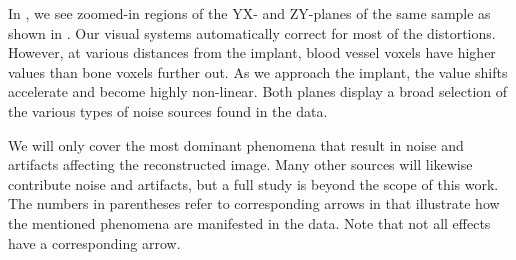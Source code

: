 In , we see zoomed-in regions of the YX- and ZY-planes of the
same sample as shown in .  Our visual systems
automatically correct for most of the distortions. However, at various
distances from the implant, blood vessel voxels have higher values than bone
voxels further out. As we approach the implant, the value shifts accelerate and
become highly non-linear.  Both planes display a broad selection of the various
types of noise sources found in the data.

We will only cover the most dominant phenomena that result in noise and
artifacts affecting the reconstructed image. Many other sources will likewise
contribute noise and artifacts, but a full study is beyond the scope of this
work. The numbers in parentheses refer to corresponding arrows in
 that illustrate how the mentioned phenomena are manifested in
the data. Note that not all effects have a corresponding arrow.


